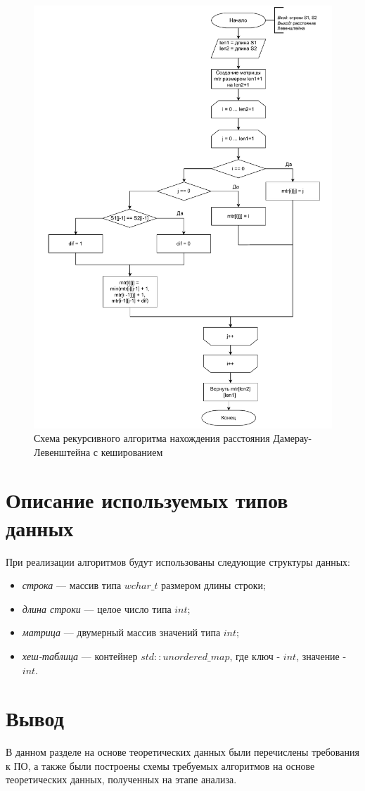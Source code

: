 \begin{figure}[h]
	\centering
	\includegraphics[height=0.9\textheight, page=4]{img/algoritms.pdf}
	\caption{Схема рекурсивного алгоритма нахождения расстояния Дамерау-Левенштейна с кешированием}
	\label{fig:DLrechash1}
\end{figure}

\clearpage

\section{Описание используемых типов данных}

При реализации алгоритмов будут использованы следующие структуры данных:

\begin{itemize}
	\item \textit{строка} --- массив типа $wchar{\_}t$ размером длины строки;
	\item \textit{длина строки} --- целое число типа $int$;
	\item \textit{матрица} --- двумерный массив значений типа $int$;
    \item \textit{хеш-таблица} --- контейнер $std::unordered{\_}map$, где ключ - $int$, значение - $int$.
\end{itemize}

\section*{Вывод}

В данном разделе на основе теоретических данных были перечислены требования к ПО, а также были построены схемы требуемых алгоритмов на основе теоретических данных, полученных на этапе анализа.
